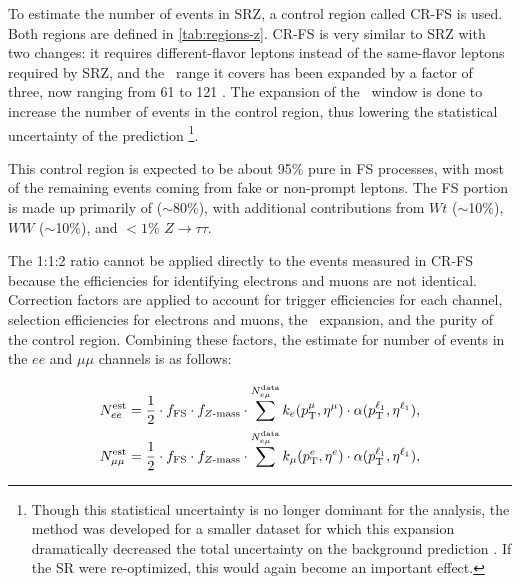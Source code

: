 To estimate the number of events in SRZ, a control region called CR-FS is used. Both regions are defined in \autoref{tab:regions-z}. CR-FS is very similar to SRZ with two changes: it requires different-flavor leptons instead of the same-flavor leptons required by SRZ, and the \mll~range it covers has been expanded by a factor of three, now ranging from 61 to 121 \gev. The expansion of the \mll~window is done to increase the number of events in the control region, thus lowering the statistical uncertainty of the prediction
\footnote{Though this statistical uncertainty is no longer dominant for the analysis, the method was developed for a smaller dataset for which this expansion dramatically decreased the total uncertainty on the background prediction \cite{zmet}. If the \ac{SR} were re-optimized, this would again become an important effect. %
}. 

This control region is expected to be about 95\% pure in \ac{FS} processes, with most of the remaining events coming from fake or non-prompt leptons. The \ac{FS} portion is made up primarily of \ttbar ($\sim$80\%), with additional contributions from $Wt$ ($\sim$10\%), $WW$ ($\sim$10\%), and $<1$\% $Z \rightarrow \tau\tau$. 

The 1:1:2 ratio cannot be applied directly to the events measured in CR-FS because the efficiencies for identifying electrons and muons are not identical. Correction factors are applied to account for trigger efficiencies for each channel, selection efficiencies for electrons and muons, the \mll~expansion, and the purity of the control region. Combining these factors, the estimate for number of events in the $ee$ and $\mu\mu$ channels is as follows:

\begin{eqnarray}
N_{ee}^\text{est} = \frac{1}{2} \cdot  f_{\mathrm{FS}} \cdot f_{Z \mathrm{\text{-}mass}} \cdot\sum^{N_{e\mu}^\text{data}} k_{e}(p_{\text{T}}^{\mu}, \eta^{\mu})\cdot \alpha(p_{\text{T}}^{\ell_1}, \eta^{\ell_1}) ,\\
N_{\mu\mu}^\text{est} = \frac{1}{2} \cdot  f_{\mathrm{FS}} \cdot f_{Z \mathrm{\text{-}mass}} \cdot \sum^{N_{e\mu}^\text{data}}k_{\mu}(p_{\text{T}}^{e}, \eta^{e})\cdot \alpha(p_{\text{T}}^{\ell_1}, \eta^{\ell_1}) ,
\end{eqnarray}

